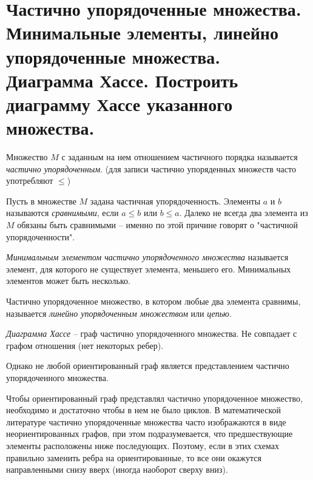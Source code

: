 \section{Частично упорядоченные множества. Минимальные элементы, линейно упорядоченные 
множества.  Диаграмма Хассе. Построить диаграмму Хассе указанного множества.}

\begin{definition}
    Множество $M$ с заданным на нем отношением частичного
    порядка называется \textit{частично упорядоченным}.
    (для записи частично упоряденных множеств часто употребляют $\leq$)
\end{definition}

Пусть в множестве $M$ задана частичная упорядоченность. Элементы $a$ и
$b$ называются \textit{сравнимыми}, если $a \leq b$ или $b \leq a$. Далеко не всегда два
элемента из $M$ обязаны быть сравнимыми -- именно по этой причине говорят
о "частичной упорядоченности".

\begin{definition}
    \textit{Минимальным элементом частично упорядоченного
    множества} называется элемент, для которого не существует элемента,
    меньшего его.
    Минимальных элементов может быть несколько.
\end{definition}

\begin{definition}
    Частично упорядоченное множество, в котором любые
    два элемента сравнимы, называется \textit{линейно упорядоченным множеством} или
    \textit{цепью}.
\end{definition}

\begin{definition}
    \textit{Диаграмма Хассе} -- граф частично упорядоченного множества.
    Не совпадает с графом отношения (нет некоторых ребер).
\end{definition}

Однако не любой ориентированный граф является представлением
частично упорядоченного множества.

Чтобы ориентированный граф представлял частично упорядоченное
множество, необходимо и достаточно чтобы в нем не было циклов. В
математической литературе частично упорядоченные множества часто
изображаются в виде неориентированных графов, при этом подразумевается,
что предшествующие элементы расположены ниже последующих. Поэтому,
если в этих схемах правильно заменить ребра на ориентированные, то все они
окажутся направленными снизу вверх (иногда наоборот сверху вниз).

